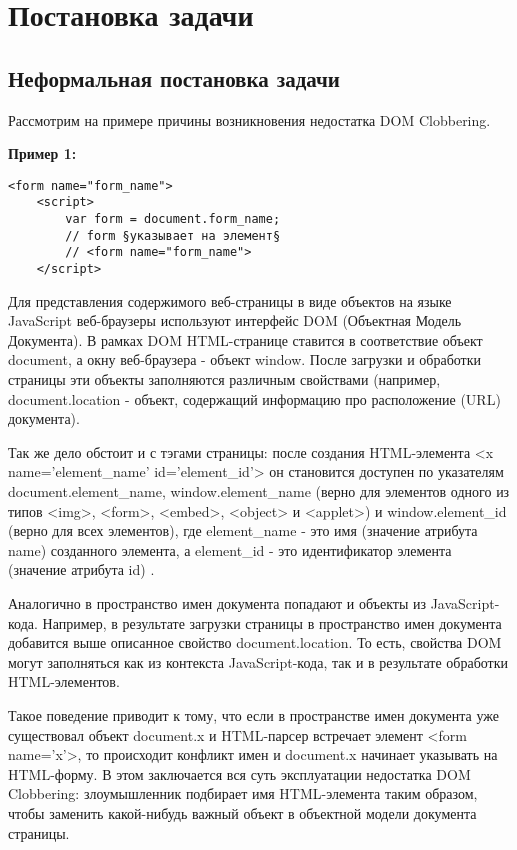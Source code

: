 
\chapter{Постановка задачи}\label{Introduction}

\section{Неформальная постановка задачи}

Рассмотрим на примере причины возникновения недостатка DOM Clobbering.

\bigskip
\textbf{Пример 1:}
\begin{lstlisting}[caption=пример недостатка DOM Clobbering]
	<form name="form_name">
	<script>
		var form = document.form_name; 
		// form §указывает на элемент§
		// <form name="form_name">
	</script>
\end{lstlisting}
\bigskip




Для представления содержимого веб-страницы в виде объектов на языке Java\-Script веб-браузеры используют интерфейс DOM (Объектная Модель Документа). В рамках DOM HTML-странице ставится в соответствие объект document, а окну веб-браузера - объект window. После загрузки и обработки страницы эти объекты заполняются различным свойствами (например, document.location - объект, содержащий информацию про расположение (URL) документа).


Так же дело обстоит и с тэгами страницы: после создания HTML-элемента <x name='element\_name' id='element\_id'> он становится доступен по указателям document.element\_name, window.element\_name (верно для элементов одного из типов <img>, <form>, <embed>, <object> и <applet>) и window.element\_id (верно для всех элементов), где element\_name - это имя (значение атрибута name) созданного элемента, а element\_id - это идентификатор элемента (значение атрибута id) \cite{TWClobbering}.



Аналогично в пространство имен документа попадают и объекты из JavaScript-кода. Например, в результате загрузки страницы в пространство имен документа добавится выше описанное свойство document.location. То есть, свойства DOM могут заполняться как из контекста JavaScript-кода, так и в результате обработки HTML-элементов.


Такое поведение приводит к тому, что если в пространстве имен документа уже существовал объект document.x и HTML-парсер встречает элемент <form name='x'>, то происходит конфликт имен и document.x начинает указывать на \\HTML-форму. В этом заключается вся суть эксплуатации недостатка DOM Clobber\-ing: злоумышленник подбирает имя HTML-элемента таким образом, чтобы заменить какой-нибудь важный объект в объектной модели документа страницы.


